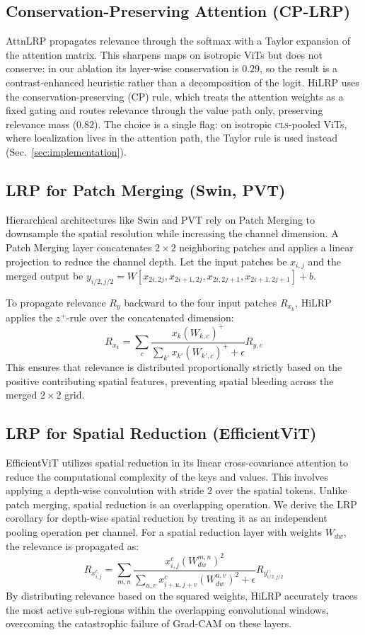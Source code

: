\documentclass[lettersize,journal]{IEEEtran}
\begin{document}
\subsection{Conservation-Preserving Attention (CP-LRP)}
AttnLRP propagates relevance through the softmax with a Taylor expansion of the attention matrix. This sharpens maps on isotropic ViTs but does not conserve: in our ablation its layer-wise conservation is $0.29$, so the result is a contrast-enhanced heuristic rather than a decomposition of the logit. HiLRP uses the conservation-preserving (CP) rule, which treats the attention weights as a fixed gating and routes relevance through the value path only, preserving relevance mass ($0.82$). The choice is a single flag: on isotropic \textsc{cls}-pooled ViTs, where localization lives in the attention path, the Taylor rule is used instead (Sec.~\ref{sec:implementation}).

\subsection{LRP for Patch Merging (Swin, PVT)}
Hierarchical architectures like Swin and PVT rely on Patch Merging to downsample the spatial resolution while increasing the channel dimension. A Patch Merging layer concatenates $2 \times 2$ neighboring patches and applies a linear projection to reduce the channel depth.
Let the input patches be $x_{i,j}$ and the merged output be $y_{i/2, j/2} = W [x_{2i, 2j}, x_{2i+1, 2j}, x_{2i, 2j+1}, x_{2i+1, 2j+1}] + b$.

To propagate relevance $R_y$ backward to the four input patches $R_{x_k}$, HiLRP applies the $z^+$-rule over the concatenated dimension:
\begin{equation}
R_{x_k} = \sum_{c} \frac{x_k (W_{k,c})^+}{\sum_{k'} x_{k'} (W_{k',c})^+ + \epsilon} R_{y, c}
\end{equation}
This ensures that relevance is distributed proportionally strictly based on the positive contributing spatial features, preventing spatial bleeding across the merged $2 \times 2$ grid.

\subsection{LRP for Spatial Reduction (EfficientViT)}
EfficientViT utilizes spatial reduction in its linear cross-covariance attention to reduce the computational complexity of the keys and values. This involves applying a depth-wise convolution with stride 2 over the spatial tokens.
Unlike patch merging, spatial reduction is an overlapping operation. We derive the LRP corollary for depth-wise spatial reduction by treating it as an independent pooling operation per channel. For a spatial reduction layer with weights $W_{dw}$, the relevance is propagated as:
\begin{equation}
R_{x_{i,j}^c} = \sum_{m,n} \frac{x_{i,j}^c (W_{dw}^{m,n})^2}{\sum_{u,v} x_{i+u,j+v}^c (W_{dw}^{u,v})^2 + \epsilon} R_{y_{i/2,j/2}^c}
\end{equation}
By distributing relevance based on the squared weights, HiLRP accurately traces the most active sub-regions within the overlapping convolutional windows, overcoming the catastrophic failure of Grad-CAM on these layers.
\end{document}
